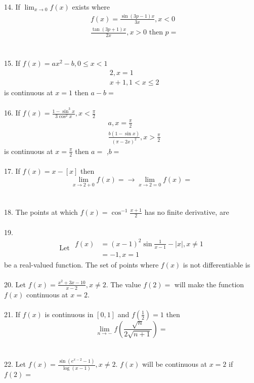 14. If $\lim _{x \rightarrow 0} f(x)$ exists where
$$
\begin{aligned}
& f(x)= \frac{\sin (3 p-1) x}{3 x}, x<0 \\
& \frac{\tan (3 p+1) x}{2 x}, x>0 \text { then } p=
\end{aligned}
$$\\\\
15. If $f(x)=a x^2-b, 0 \leq x<1$
$$
\begin{aligned}
& 2, x=1 \\
& x+1,1<x \leq 2
\end{aligned}
$$
is continuous at $x=1$ then $a-b=$\\\\
16. If $f(x)=\frac{1-\sin ^3 x}{3 \cos ^2 x}, x<\frac{\pi}{2}$
$$
\begin{aligned}
& a, x=\frac{\pi}{2} \\
& \frac{b(1-\sin x)}{(\pi-2 x)^2}, x>\frac{\pi}{2}
\end{aligned}
$$
is continuous at $x=\frac{\pi}{2}$ then $a=$ ,$b=$\\\\
17. If $f(x)=x-[x]$ then
$$
\lim _{x \rightarrow 2+0} f(x)=\longrightarrow \lim _{x \rightarrow 2=0} f(x)=
$$\\\\
18. The points at which $f(x)=\cos ^{-1} \frac{x+1}{2}$ has no finite derivative, are\\\\
19.
$$
\text { Let } \begin{aligned}
f(x) & =(x-1)^2 \sin \frac{1}{x-1}-|x|, x \neq 1 \\
& =-1, x=1
\end{aligned}
$$
be a real-valued function. The set of points where $f(x)$ is not differentiable is\\\\
20. Let $f(x)=\frac{x^2+3 x-10}{x-2}, x \neq 2$.
The value $f(2)=$ will make the function $f(x)$ continuous at $x=2$.\\\\
21. If $f(x)$ is continuous in $[0,1]$ and $f\left(\frac{1}{2}\right)=1$ then
$$
\lim _{n \rightarrow-} f\left(\frac{\sqrt{n}}{2 \sqrt{n+1}}\right)=
$$\\\\
22. Let $f(x)=\frac{\sin \left(e^{x-2}-1\right)}{\log (x-1)}, x \neq 2$.
$f(x)$ will be continuous at $x=2$ if $f(2)=$